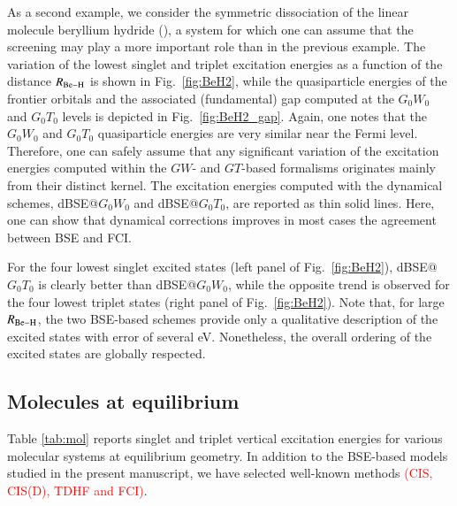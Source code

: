 \documentclass[aip,jcp,reprint,noshowkeys,superscriptaddress]{revtex4-1}
\newcommand{\titou}[1]{\textcolor{red}{#1}}
\begin{document}
As a second example, we consider the symmetric dissociation of the linear molecule beryllium hydride (), a system for which one can assume that the screening may play a more important role than in the previous example.
The variation of the lowest singlet and triplet excitation energies as a function of the distance $R_{\ce{Be-H}}$ is shown in Fig.~\ref{fig:BeH2}, while the quasiparticle energies of the frontier orbitals and the associated (fundamental) gap computed at the $G_0W_0$ and $G_0T_0$ levels is depicted in Fig.~\ref{fig:BeH2_gap}.
Again, one notes that the $G_0W_0$ and $G_0T_0$ quasiparticle energies are very similar near the Fermi level.
Therefore, one can safely assume that any significant variation of the excitation energies computed within the $GW$- and $GT$-based formalisms originates mainly from their distinct kernel.
The excitation energies computed with the dynamical schemes, dBSE@$G_0W_0$ and dBSE@$G_0T_0$, are reported as thin solid lines.
Here, one can show that dynamical corrections improves in most cases the agreement between BSE and FCI.

For the four lowest singlet excited states (left panel of Fig.~\ref{fig:BeH2}), dBSE@$G_0T_0$ is clearly better than dBSE@$G_0W_0$, while the opposite trend is observed for the four lowest triplet states (right panel of Fig.~\ref{fig:BeH2}).
Note that, for large $R_{\ce{Be-H}}$, the two BSE-based schemes provide only a qualitative description of the excited states with error of several \si{\eV}.
Nonetheless, the overall ordering of the excited states are globally respected.

\subsection{Molecules at equilibrium}
\label{sec:mol}

Table \ref{tab:mol} reports singlet and triplet vertical excitation energies for various molecular systems at equilibrium geometry.
In addition to the BSE-based models studied in the present manuscript, we have selected well-known methods \titou{(CIS, CIS(D), TDHF and FCI)}.
\end{document}
